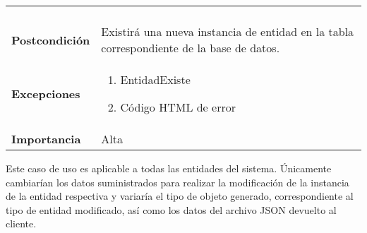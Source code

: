 \begin{longtable}{ p{} p{} }
\begin{enumerate}
    \end{enumerate}\\
    \textbf{Postcondición}        & Existirá una nueva instancia de entidad en la tabla correspondiente de la base de datos. \\
    \textbf{Excepciones}          & 
        \begin{enumerate}
            \item EntidadExiste
            \item Código HTML de error
        \end{enumerate} \\
    \textbf{Importancia}          & Alta \\
    \bottomrule
    \hline
\end{longtable}


\newpage
Este caso de uso es aplicable a todas las entidades del sistema. Únicamente cambiarían los datos suministrados para realizar la modificación de la instancia de la entidad respectiva y variaría el tipo de objeto generado, correspondiente al tipo de entidad modificado, así como los datos del archivo JSON devuelto al cliente.

